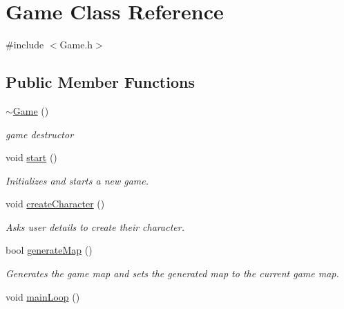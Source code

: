 \hypertarget{classGame}{
\section{Game Class Reference}
\label{classGame}
}


{\ttfamily \#include $<$Game.h$>$}\subsection*{Public Member Functions}
\begin{DoxyCompactItemize}
\item 
\hypertarget{classGame_ae3d112ca6e0e55150d2fdbc704474530}{
\hyperlink{classGame_ae3d112ca6e0e55150d2fdbc704474530}{$\sim$Game} ()}
\label{classGame_ae3d112ca6e0e55150d2fdbc704474530}

\begin{DoxyCompactList}\small\item\em game destructor \item\end{DoxyCompactList}\item 
\hypertarget{classGame_a3d9b98f7c4a96ecf578f75b96c9f0e90}{
void \hyperlink{classGame_a3d9b98f7c4a96ecf578f75b96c9f0e90}{start} ()}
\label{classGame_a3d9b98f7c4a96ecf578f75b96c9f0e90}

\begin{DoxyCompactList}\small\item\em Initializes and starts a new game. \item\end{DoxyCompactList}\item 
\hypertarget{classGame_afee58e8faabb40341b8a2dfb37357e12}{
void \hyperlink{classGame_afee58e8faabb40341b8a2dfb37357e12}{createCharacter} ()}
\label{classGame_afee58e8faabb40341b8a2dfb37357e12}

\begin{DoxyCompactList}\small\item\em Asks user details to create their character. \item\end{DoxyCompactList}\item 
\hypertarget{classGame_a77584a176affdd5548f781d0461fd24c}{
bool \hyperlink{classGame_a77584a176affdd5548f781d0461fd24c}{generateMap} ()}
\label{classGame_a77584a176affdd5548f781d0461fd24c}

\begin{DoxyCompactList}\small\item\em Generates the game map and sets the generated map to the current game map. \item\end{DoxyCompactList}\item 
\hypertarget{classGame_ae89e277761b7dc5bc7a23fd1b4c6f17d}{
void \hyperlink{classGame_ae89e277761b7dc5bc7a23fd1b4c6f17d}{mainLoop} ()}
\label{classGame_ae89e277761b7dc5bc7a23fd1b4c6f17d}


\end{DoxyCompactItemize}
